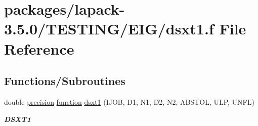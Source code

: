 \hypertarget{dsxt1_8f}{}\section{packages/lapack-\/3.5.0/\+T\+E\+S\+T\+I\+N\+G/\+E\+I\+G/dsxt1.f File Reference}
\label{dsxt1_8f}
\subsection*{Functions/\+Subroutines}
\begin{DoxyCompactItemize}
\item 
double \hyperlink{numinquire_8h_a2c8e616467665d0b2814d4c1589ba74e}{precision} \hyperlink{afunc_8m_a7b5e596df91eadea6c537c0825e894a7}{function} \hyperlink{group__double__eig_ga3ddc3e6002ccca1ee7b31370e4e8b523}{dsxt1} (I\+J\+O\+B, D1, N1, D2, N2, A\+B\+S\+T\+O\+L, U\+L\+P, U\+N\+F\+L)
\begin{DoxyCompactList}\small\item\em {\bfseries D\+S\+X\+T1} \end{DoxyCompactList}\end{DoxyCompactItemize}
